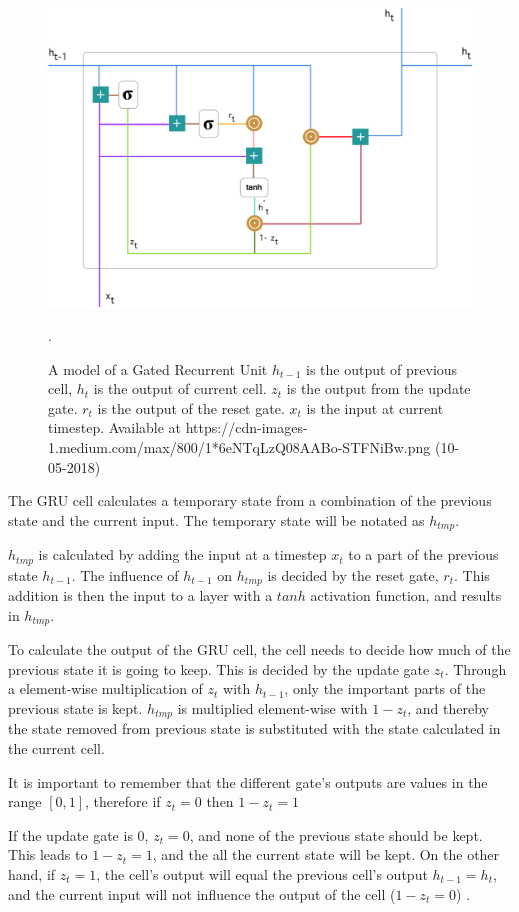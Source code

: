 \begin{figure}[H]
    \centering
    \includegraphics[width=\textwidth]{Assets/Chapter2_Theory/GRU-cell.png}
    \caption{A model of a Gated Recurrent Unit $h_{t-1}$ is the output of previous cell, $h_t$ is the output of current cell. $z_t$ is the output from the update gate. $r_t$ is the output of the reset gate. $x_t$ is the input at current timestep. Available at https://cdn-images-1.medium.com/max/800/1*6eNTqLzQ08AABo-STFNiBw.png (10-05-2018) \cite{kostadinov_understanding_2017}}.  
    \label{fig:gru-single-cell}
\end{figure}

The GRU cell calculates a temporary state from a combination of the previous state and the current input. The temporary state will be notated as $h_{tmp}$.

$h_{tmp}$ is calculated by adding the input at a timestep $x_t$ to a part of the previous state $h_{t-1}$. The influence of $h_{t-1}$ on $h_{tmp}$ is decided by the reset gate, $r_t$. This addition is then the input to a layer with a $tanh$ activation function, and results in $h_{tmp}$.

To calculate the output of the GRU cell, the cell needs to decide how much of the previous state it is going to keep. This is decided by the update gate $z_t$. Through a element-wise multiplication of $z_t$ with $h_{t-1}$, only the important parts of the previous state is kept. $h_{tmp}$ is multiplied element-wise with $1 - z_t$, and thereby the state removed from previous state is substituted with the state calculated in the current cell.

It is important to remember that the different gate's outputs are values in the range $[0, 1]$, therefore if $z_t = 0$ then $1 - z_t = 1$

If the update gate is 0, $z_t = 0$, and none of the previous state should be kept. This leads to $1 - z_t = 1$, and the all the current state will be kept. On the other hand, if $z_t = 1$, the cell's output will equal the previous cell's output $h_{t-1} = h_t$, and the current input will not influence the output of the cell ($1 - z_t = 0$) \cite{kostadinov_understanding_2017}.